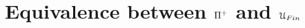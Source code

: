 \section{Equivalence between \texorpdfstring{$\PiPlusLang$}{Pi} and \texorpdfstring{$\UFin$}{UFin}}~\label{sec:equivalence}


